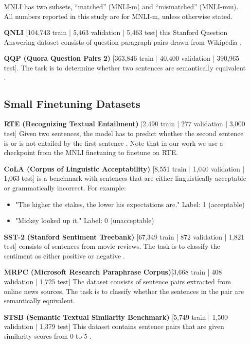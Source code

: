 MNLI has two subsets, ``matched'' (MNLI-m) and ``mismatched'' (MNLI-mm). All numbers reported in this study are for MNLI-m, unless otherwise stated.

\textbf{QNLI} [104,743 train | 5,463 validation | 5,463 test] this Stanford Question Answering dataset consists of question-paragraph pairs drawn from Wikipedia \citep{rajpurkar2016squad}.

\textbf{QQP (Quora Question Pairs 2) }[363,846 train | 40,400 validation | 390,965 test]. The task is to determine whether two sentences are semantically equivalent \citep{Iyer2017Quora}.

\subsection{Small Finetuning Datasets}

\textbf{RTE (Recognizing Textual Entailment) }[2,490 train | 277 validation | 3,000 test] Given two sentences, the model has to predict whether the second sentence is or is not entailed by the first sentence \citep{dagan2006pascal,giampiccolo2007third,bentivogli2009fifth}. Note that in our work we use a checkpoint from the MNLI finetuning to finetune on RTE.

\textbf{CoLA (Corpus of Linguistic Acceptability)} [8,551 train | 1,040 validation | 1,063 test] \citep{warstadt2019neural} is a benchmark with sentences that are either linguistically acceptable or grammatically incorrect. For example: 
\begin{itemize}
    \item "The higher the stakes, the lower his expectations are." Label: 1 (acceptable)
    \item "Mickey looked up it." Label: 0 (unacceptable)
\end{itemize}

\textbf{SST-2 (Stanford Sentiment Treebank)} [67,349 train | 872 validation | 1,821 test] consists of sentences from movie reviews. The task is to classify the sentiment as either positive or negative \citep{socher2013recursive}.



\textbf{MRPC (Microsoft Research Paraphrase Corpus)}[3,668 train | 408 validation | 1,725 test] \citep{dolan2005automatically} The dataset consists of sentence pairs extracted from online news sources. The task is to classify whether the sentences in the pair are semantically equivalent.

\textbf{STSB (Semantic Textual Similarity Benchmark) }[5,749 train | 1,500 validation | 1,379 test] This dataset contains sentence pairs that are given similarity scores from 0 to 5 \citep{cer2017semeval}.


